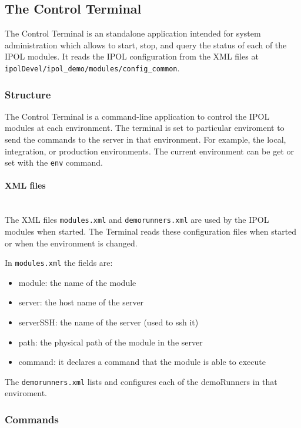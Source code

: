 \subsection{The Control Terminal}

The Control Terminal is an standalone application intended for system administration which allows to start, stop, and query the status of each of the IPOL modules. It reads the IPOL configuration from the XML files at {\tt ipolDevel/ipol\_demo/modules/config\_common}.

\subsubsection{Structure}
The Control Terminal is a command-line application to control the IPOL modules at each environment. The terminal is set to particular  enviroment to send the commands to the server in that environment. For example, the local, integration, or production environments. The current environment can be get or set with the {\tt env} command.

\paragraph{XML files} \hspace{0pt} \\
The XML files {\tt modules.xml} and {\tt demorunners.xml} are used by the IPOL modules when started. The Terminal reads these configuration files when started or when the environment is changed.

In {\tt modules.xml} the fields are:
\begin{itemize}
    \item module: the name of the module
    \item server: the host name of the server
    \item serverSSH: the name of the server (used to ssh it)
    \item path: the physical path of the module in the server
    \item command: it declares a command that the module is able to execute
\end{itemize}

The {\tt demorunners.xml} lists and configures each of the demoRunners in that enviroment.

\subsubsection{Commands}
